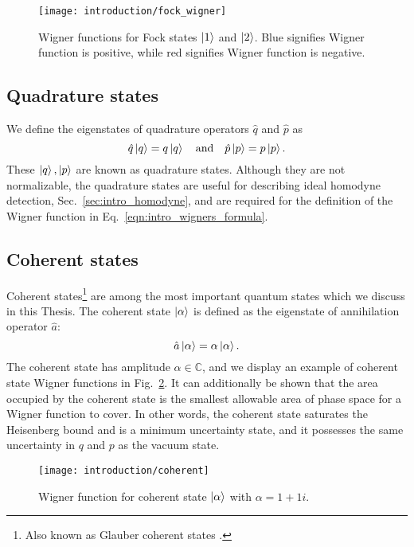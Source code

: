 \begin{figure}[htp]
\centering
\captionsetup{width=0.8\linewidth}
\texttt{[image: introduction/fock\_wigner]}
\caption{\label{fig:intro_fock_wigner} Wigner functions for Fock states $\ket{1}$ and $\ket{2}$. Blue signifies Wigner function is positive, while red signifies Wigner function is negative. }
\end{figure}



\FloatBarrier
\subsection{Quadrature states}
We define the eigenstates of quadrature operators $\hat{q}$ and $\hat{p}$ as
\begin{equation}\label{eqn:intro_quadrature_state}
\hat{q}\ket{q} = q \ket{q} \qq{and} \hat{p}\ket{p} = p \ket{p}.
\end{equation}
These $\ket{q}, \ket{p}$ are known as quadrature states. Although they are not normalizable, the quadrature states are useful for describing ideal homodyne detection, Sec.~\ref{sec:intro_homodyne}, and are required for the definition of the Wigner function in Eq.~\ref{eqn:intro_wigners_formula}.


\FloatBarrier
\subsection{Coherent states}
Coherent states\footnote{Also known as Glauber coherent states \cite{Glauber1963}.} are among the most important quantum states which we discuss in this Thesis. The coherent state $\ket{\alpha}$ is defined as the eigenstate of annihilation operator $\hat{a}$:
\begin{equation}
\hat{a}\ket{\alpha} = \alpha \ket{\alpha}.
\end{equation}
The coherent state has amplitude $\alpha \in \mathbb{C}$, and we display an example of coherent state Wigner functions in Fig.~\ref{fig:intro_coherent_wigner}. It can additionally be shown that the area occupied by the coherent state is the smallest allowable area of phase space for a Wigner function to cover. In other words, the coherent state saturates the Heisenberg bound and is a minimum uncertainty state, and it possesses the same uncertainty in $q$ and $p$ as the vacuum state.

\begin{figure}[htp]
\centering
\captionsetup{width=0.8\linewidth}
\texttt{[image: introduction/coherent]}
\caption{\label{fig:intro_coherent_wigner} Wigner function for coherent state $\ket{\alpha}$ with $\alpha = 1 + 1i$.}
\end{figure}


